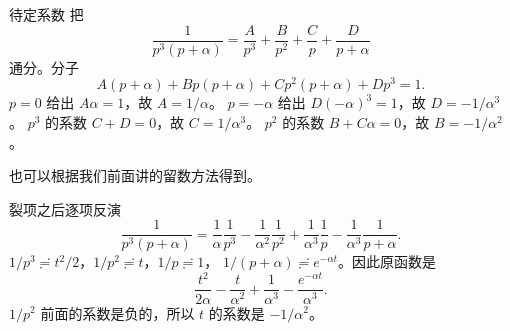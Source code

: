 \documentclass[fontset=windows, chinese, 10pt, xcolor=dvipsnames]{beamer}
\begin{document}
\begin{frame}{待定系数}
  把
  \begin{equation*}
    \frac{1}{p^3(p+\alpha)}
    =\frac{A}{p^3}+\frac{B}{p^2}+\frac{C}{p}+\frac{D}{p+\alpha}
  \end{equation*}
  通分。分子
  \begin{equation*}
    A(p+\alpha)+Bp(p+\alpha)+Cp^2(p+\alpha)+Dp^3=1.
  \end{equation*}
  $p=0$ 给出 $A\alpha=1$，故 $A=1/\alpha$。
  $p=-\alpha$ 给出 $D(-\alpha)^3=1$，故 $D=-1/\alpha^3$。
  $p^3$ 的系数 $C+D=0$，故 $C=1/\alpha^3$。
  $p^2$ 的系数 $B+C\alpha=0$，故 $B=-1/\alpha^2$。

  也可以根据我们前面讲的留数方法得到。
\end{frame}

\begin{frame}{裂项之后逐项反演}
  \begin{equation*}
    \frac{1}{p^3(p+\alpha)}
    =\frac{1}{\alpha}\frac{1}{p^3}
     -\frac{1}{\alpha^2}\frac{1}{p^2}
     +\frac{1}{\alpha^3}\frac{1}{p}
     -\frac{1}{\alpha^3}\frac{1}{p+\alpha}.
  \end{equation*}
  $1/p^3\risingdotseq t^2/2$，$1/p^2\risingdotseq t$，$1/p\risingdotseq 1$，
  $1/(p+\alpha)\risingdotseq e^{-\alpha t}$。因此原函数是
  \begin{equation*}
    \frac{t^2}{2\alpha}-\frac{t}{\alpha^2}
    +\frac{1}{\alpha^3}-\frac{e^{-\alpha t}}{\alpha^3}.
  \end{equation*}
  $1/p^2$ 前面的系数是负的，所以 $t$ 的系数是 $-1/\alpha^2$。
\end{frame}
\end{document}
